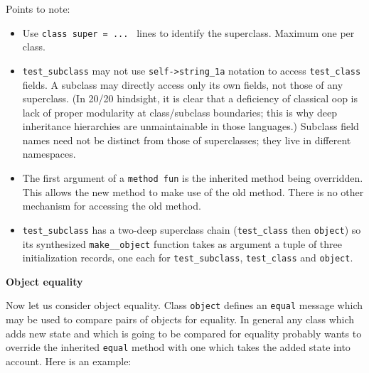Points to note:
\begin{itemize}
\item Use {\tt class super = ... } lines to identify the superclass. Maximum one per class. 
\item {\tt test\_subclass} may not use {\tt self->string\_1a} notation to access {\tt test\_class} fields. 
      A subclass may directly access only its own fields, not those of any superclass.  (In 20/20 hindsight, 
      it is clear that a deficiency of classical oop is lack of proper modularity at class/subclass boundaries; 
      this is why deep inheritance hierarchies are unmaintainable in those languages.)  Subclass field names need not be 
      distinct from those of superclasses;  they live in different namespaces.  
\item The first argument of a {\tt method fun} is the inherited method being overridden.  This allows 
      the new method to make use of the old method.  There is no other mechanism for accessing the old 
      method.
\item {\tt test\_subclass} has a two-deep superclass chain ({\tt test\_class} then {\tt object}) so its 
      synthesized {\tt make\_\_object} function takes as argument a tuple of three initialization records, 
      one each for {\tt test\_subclass},  {\tt test\_class} and  {\tt object}.
\end{itemize}

{\bf Object equality}

Now let us consider object equality.  Class {\tt object} defines an {\tt equal} message 
which may be used to compare pairs of objects for equality.  In general any class which 
adds new state and which is going to be compared for equality probably wants to override 
the inherited {\tt equal} method with one which takes the added state into account.
Here is an example:

